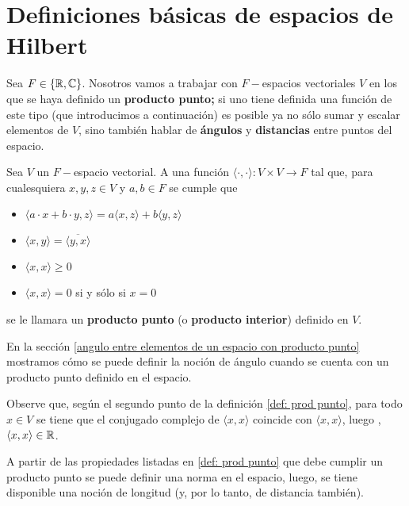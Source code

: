 \section{Definiciones básicas de espacios de Hilbert}
\label{sec: def basicas Hilbert}

Sea $F \in \{ \mathbb{R}, \mathbb{C} \}$.
Nosotros vamos a trabajar con $F-$espacios vectoriales
$V$ en los que se haya definido un \textbf{producto punto;}
si uno tiene definida una función
de este tipo (que introducimos a continuación)
es posible ya no sólo sumar y escalar elementos de $V$, sino
también hablar de \textbf{ángulos}
y \textbf{distancias} entre puntos del espacio.


\begin{defi}
\label{def: prod punto}
Sea $V$ un $F-$espacio vectorial. A una función
$\langle \cdot, \cdot \rangle : V \times V \longrightarrow F$
tal que, para cualesquiera $x, y, z \in V$ 
y $a, b \in F$
se cumple que 

	\begin{itemize}
	\item $\langle a \cdot x + b \cdot y, z \rangle = 
	a \langle x, z \rangle + b \langle y, z \rangle$
	\item $\langle x, y \rangle = \overline{\langle y, x \rangle} $
	\item $\langle x, x \rangle \geq 0 $
	\item $\langle x, x \rangle = 0 $ si y sólo si $x=0$
	\end{itemize}
se le llamara un \textbf{producto punto} (o \textbf{producto interior})
definido en $V$.
\end{defi}


En la sección
\ref{angulo entre elementos de un espacio con producto punto}
mostramos cómo se puede definir la noción de ángulo cuando
se cuenta con un producto punto definido en el espacio.


Observe que, según el segundo punto de la definición 
\ref{def: prod punto}, 
para todo $x \in V$ se tiene que el conjugado complejo
de $\langle x, x \rangle$ coincide con $\langle x, x \rangle$, luego
,
$\langle x, x \rangle \in \mathbb{R}$.

A partir de las propiedades listadas en 
\ref{def: prod punto}
que debe cumplir un 
producto punto se puede definir una norma
 en el espacio, luego, 
se tiene disponible
una noción de longitud (y, por lo tanto, de distancia también).


